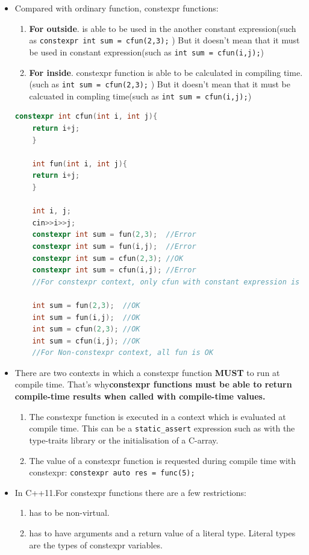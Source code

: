 \documentclass[a4paper,11pt,twoside]{book}
\begin{document}
\begin{itemize}
	
	\item Compared with ordinary function, constexpr functions:
	\begin{enumerate}
		\item \textbf{For outside}. is able to be used in the another constant expression(such as \texttt{constexpr int sum = cfun(2,3);} ) But it doesn't mean that it must be used in constant expression(such as \texttt{int sum = cfun(i,j);})
		
		\item \textbf{For inside}. constexpr function is able to be calculated in compiling time. (such as \texttt{int sum = cfun(2,3);} ) But it doesn't mean that it must be calcuated in compling time(such as \texttt{int sum = cfun(i,j);})
	\end{enumerate}
	
	
	\begin{lstlisting}[frame=single, language=c++]	
	constexpr int cfun(int i, int j){
	return i+j;
	}
	
	int fun(int i, int j){
	return i+j;
	}
	
	int i, j;
	cin>>i>>j;
	constexpr int sum = fun(2,3);  //Error
	constexpr int sum = fun(i,j);  //Error
	constexpr int sum = cfun(2,3); //OK
	constexpr int sum = cfun(i,j); //Error
	//For constexpr context, only cfun with constant expression is OK
	
	int sum = fun(2,3);  //OK
	int sum = fun(i,j);  //OK
	int sum = cfun(2,3); //OK
	int sum = cfun(i,j); //OK
	//For Non-constexpr context, all fun is OK
	\end{lstlisting}		
	
	\item There are two contexts in which a constexpr function \textbf{MUST} to run at compile time. That's why\textbf{constexpr functions must be able to return compile-time results when called with compile-time values.}
	\begin{enumerate}
		\item The constexpr function is executed in a context which is evaluated at compile time. This can be a \texttt{static\_assert} expression such as with the type-traits library or the initialisation of a C-array.
		
		\item The value of a constexpr function is requested during compile time with constexpr: \texttt{constexpr auto res = func(5);}
	\end{enumerate}
	
	\item In C++11.For constexpr functions there are a few restrictions:
	\begin{enumerate}
		\item has to be non-virtual.
		\item has to have arguments and a return value of a literal type. Literal types are the types of constexpr variables.
	\end{enumerate}
	

\end{itemize}
\end{document}
